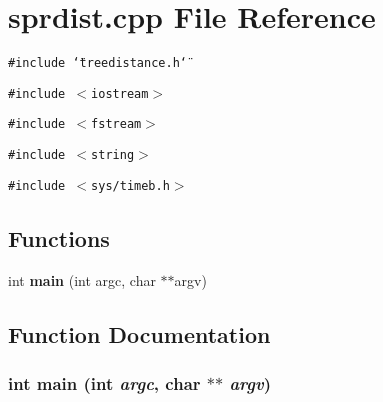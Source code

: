 \section{sprdist.cpp File Reference}
\label{sprdist_8cpp}
{\tt \#include \char`\"{}treedistance.h\char`\"{}}\par
{\tt \#include $<$iostream$>$}\par
{\tt \#include $<$fstream$>$}\par
{\tt \#include $<$string$>$}\par
{\tt \#include $<$sys/timeb.h$>$}\par
\subsection*{Functions}
\begin{CompactItemize}
\item 
int {\bf main} (int argc, char $\ast$$\ast$argv)
\end{CompactItemize}


\subsection{Function Documentation}
\subsubsection{\setlength{\rightskip}{0pt plus 5cm}int main (int {\em argc}, char $\ast$$\ast$ {\em argv})}\label{sprdist_8cpp_a0}


